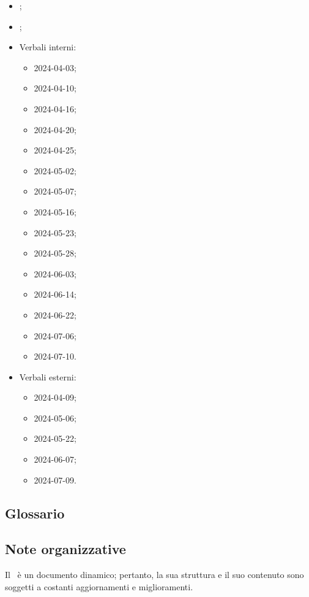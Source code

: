 \begin{itemize}
  \item \Glossario;
  \item \PianoDiProgetto;
  \item Verbali interni:
  \begin{itemize}
    \item 2024-04-03;
    \item 2024-04-10;
    \item 2024-04-16;
    \item 2024-04-20;
    \item 2024-04-25;
    \item 2024-05-02;
    \item 2024-05-07;
    \item 2024-05-16;
    \item 2024-05-23;
    \item 2024-05-28;
    \item 2024-06-03;
    \item 2024-06-14;
    \item 2024-06-22;
    \item 2024-07-06;
    \item 2024-07-10.
  \end{itemize}
  \item Verbali esterni:
  \begin{itemize}
    \item 2024-04-09;
    \item 2024-05-06;
    \item 2024-05-22;
    \item 2024-06-07;
    \item 2024-07-09.
  \end{itemize}
\end{itemize}

\subsection{Glossario} 
\GlossarioIntroduzione

\subsection{Note organizzative}

\par Il \PdQ\ è un documento dinamico; pertanto, la sua struttura e il suo contenuto sono soggetti a costanti aggiornamenti e miglioramenti.
